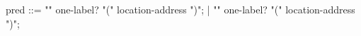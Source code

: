\begin{syntax}
  pred ::= "\initialized"  one-label? "(" location-address ")";
       | "\dangling"  one-label? "(" location-address ")";
       \
\end{syntax}

